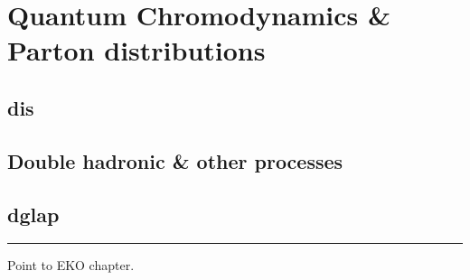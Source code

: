 
\chapter{Quantum Chromodynamics \& Parton distributions}
\label{ch:qcd}
\minitoc
\adjustmtc
\bigskip



\section{\acrlong{dis}}
\label{sec:qcd/dis}


\section{Double hadronic \& other processes}
\label{sec:qcd/dy}


\section{\acrlong{dglap}}
\label{sec:qcd/dglap}
% 

\vspace*{20pt}
\noindent\rule{\hsize}{1pt}
Point to EKO chapter.
